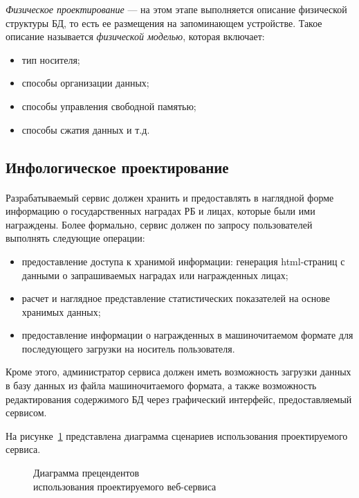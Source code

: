 \textit{Физическое проектирование} --- на этом этапе выполняется описание физической
структуры БД, то есть ее размещения на запоминающем устройстве.
Такое описание называется \textit{физической моделью}, которая включает:

\begin{itemize}
\item
  тип носителя;
\item
  способы организации данных;
\item
  способы управления свободной памятью;
\item
  способы сжатия данных и т.д.
\end{itemize}

\subsection{Инфологическое проектирование}
\label{ssub:db_info_stage}

\paragraph{}
Разрабатываемый сервис должен хранить и предоставлять в наглядной форме 
информацию о государственных наградах РБ и лицах, которые были ими награждены.
Более формально, сервис должен по запросу пользователей выполнять следующие операции:
\begin{itemize}
\item
  предоставление доступа к хранимой информации: генерация html-страниц с данными
  о запрашиваемых наградах или награжденных лицах;
\item
  расчет и наглядное представление статистических показателей на основе хранимых данных;
\item
  предоставление информации о награжденных в машиночитаемом формате для последующего 
  загрузки на носитель пользователя. 
\end{itemize}

Кроме этого, администратор сервиса должен иметь возможность загрузки данных в базу данных
из файла машиночитаемого формата, а также возможность редактирования содержимого БД
через графический интерфейс, предоставляемый сервисом.

На рисунке~\ref{fig:use-case_diagram} представлена диаграмма сценариев
использования проектируемого сервиса.

\begin{figure}[h!]
  \centering
  \small{
    
  }
  \caption{Диаграмма прецендентов \\ использования проектируемого веб-сервиса}
  \label{fig:use-case_diagram}
\end{figure}

